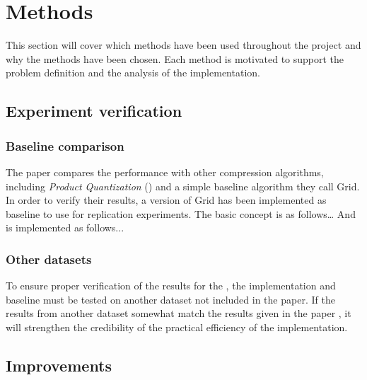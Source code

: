 \section{Methods}
\label{methods}
This section will cover which methods have been used throughout the project and why the methods have been chosen. Each method is motivated to support the problem definition and the analysis of the \qs{} implementation. 

\subsection{Experiment verification}
\subsubsection{Baseline comparison}
The paper compares the \qs{} performance with other compression algorithms, including \textit{Product Quantization} (\pq{}) and a simple baseline algorithm they call Grid. In order to verify their results, a version of Grid has been implemented as baseline to use for replication experiments. The basic concept is as follows… And is implemented as follows...

\subsubsection{Other datasets}
To ensure proper verification of the results for the \qs{}, the implementation and baseline must be tested on another dataset not included in the paper. If the results from another dataset somewhat match the results given in the paper \cite{wagner17}, it will strengthen the credibility of the practical efficiency of the \qs{} implementation.

\subsection{Improvements}
